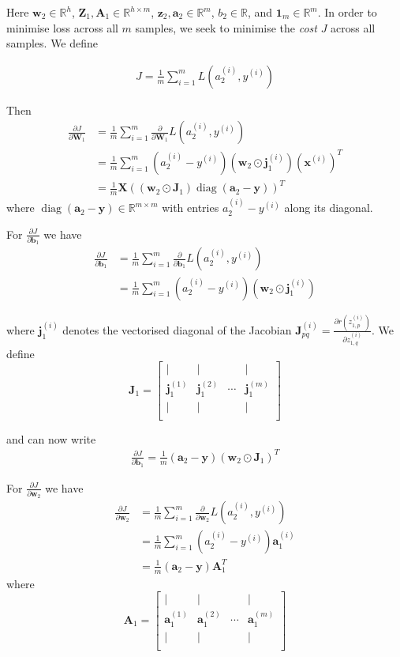 \documentclass[varwidth,border=2cm]{standalone}
\newcommand{\pd}[2]{\frac{\partial #1}{\partial #2}}
\begin{document}
Here $\bm w_2 \in \mathbb{R}^{h}$, $\bm Z_1, \bm A_1 \in \mathbb{R}^{h \times m}$, $\bm z_2, \bm a_2 \in \mathbb{R}^m$, $b_2 \in \mathbb{R}$, and $\bm 1_m \in \mathbb{R}^m$. In order to minimise loss across all $m$ samples, we seek to minimise the \textit{cost} $J$ across all samples. We define

\begin{align}
J = \frac{1}{m}\displaystyle \sum _{i=1} ^m L(a_{2}^{(i)}, y^{(i)})
\end{align}

Then
\begin{align}
\pd{J}{\bm W_1} &= \frac{1}{m} \displaystyle \sum _{i=1}^m \pd{}{\bm W_1}L(a_{2}^{(i)}, y^{(i)}) \\
 &= \frac{1}{m} \displaystyle \sum _{i=1}^m (a_2^{(i)} - y^{(i)})(\bm w_2 \odot \bm j_1 ^{(i)}) (\bm x^{(i)})^T \nonumber \\
 &= \frac{1}{m} \bm X ((\bm w_2 \odot \bm J_1)\operatorname{ diag}(\bm a_2 - \bm y))^T \nonumber
\end{align}
where $\operatorname{diag}(\bm a_2 - \bm y) \in \mathbb{R}^{m \times m}$ with entries $a_2^{(i)} - y^{(i)}$ along its diagonal.

For $\pd{J}{\bm b_1}$ we have
\begin{align}
\pd{J}{\bm b_1} &= \frac{1}{m} \displaystyle \sum _{i=1}^m \pd{}{\bm b_1}L(a_{2}^{(i)}, y^{(i)}) \\
 &= \frac{1}{m} \displaystyle \sum _{i=1}^m (a_2^{(i)} - y^{(i)})(\bm w_2 \odot \bm j_1 ^{(i)})\nonumber
\end{align}

where $\bm j_1^{(i)}$ denotes the vectorised diagonal of the Jacobian $\bm J^{(i)}_{pq} = \pd{r\left(z_{1,p}^{(i)}\right)}{z^{(i)}_{1,q}}$. We define
$$
\bm J_1 =  
\left[
\begin{array}{cccc}
| & | &        & | \\
\bm{j}_1^{(1)} & \bm{j}_1^{(2)} & \cdots & \bm{j}_1^{(m)} \\
| & | &        & | \\
\end{array}
\right]
$$

and can now write
\begin{align}
\pd{J}{\bm b_1} = \frac{1}{m} (\bm a_2 - \bm y)(\bm w_2 \odot \bm J_1)^T
\end{align}

For $\pd{J}{\bm w_2}$ we have
\begin{align}
\pd{J}{\bm w_2} &= \frac{1}{m} \displaystyle \sum _{i=1}^m \pd{}{\bm w_2}L(a_{2}^{(i)}, y^{(i)}) \\
 &= \frac{1}{m} \displaystyle \sum _{i=1}^m (a_2^{(i)} - y^{(i)})\bm a_1^{(i)} \nonumber \\
 &= \frac{1}{m} (\bm a_2 - \bm y)\bm A_1^T \nonumber
\end{align}
where
$$
\bm A_1 =  
\left[
\begin{array}{cccc}
| & | &        & | \\
\bm{a}_1^{(1)} & \bm{a}_1^{(2)} & \cdots & \bm{a}_1^{(m)} \\
| & | &        & | \\
\end{array}
\right]
$$
\end{document}
